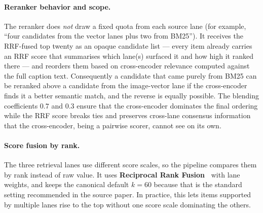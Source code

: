 \paragraph{Reranker behavior and scope.}
The reranker does \emph{not} draw a fixed quota from each source lane (for example, ``four candidates from the vector lanes plus two from BM25''). It receives the RRF-fused top twenty as an opaque candidate list --- every item already carries an RRF score that summarises which lane(s) surfaced it and how high it ranked there --- and reorders them based on cross-encoder relevance computed against the full caption text. Consequently a candidate that came purely from BM25 can be reranked above a candidate from the image-vector lane if the cross-encoder finds it a better semantic match, and the reverse is equally possible. The blending coefficients $0.7$ and $0.3$ ensure that the cross-encoder dominates the final ordering while the RRF score breaks ties and preserves cross-lane consensus information that the cross-encoder, being a pairwise scorer, cannot see on its own.

\paragraph{Score fusion by rank.} 
The three retrieval lanes use different score scales, so the pipeline compares them by rank instead of raw value. It uses \textbf{Reciprocal Rank Fusion~\cite{cormack2009rrf}} with lane weights, and keeps the canonical default $k=60$ because that is the standard setting recommended in the source paper. In practice, this lets items supported by multiple lanes rise to the top without one score scale dominating the others.


